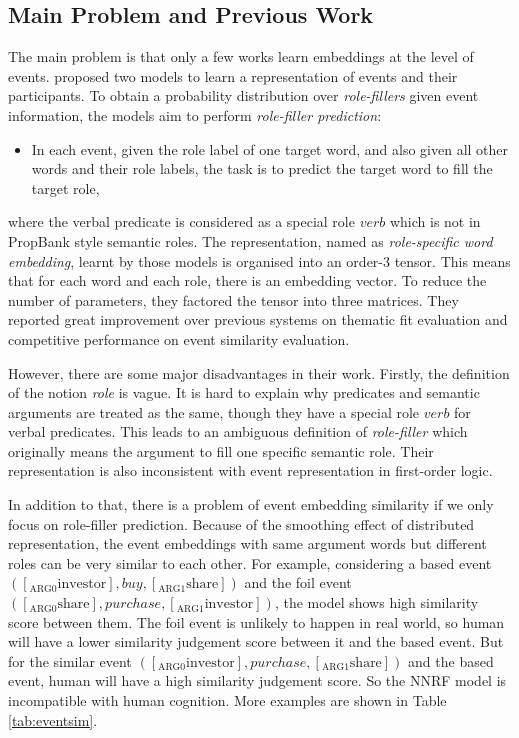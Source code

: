\documentclass[a4paper]{article}
\begin{document}
\subsection{Main Problem and Previous Work}
The main problem is that only a few works learn embeddings at the level of events. \citet{tilk2016event} proposed two models to learn a representation of events and their participants. To obtain a probability distribution over \textit{role-fillers} given event information, the models aim to perform \textit{role-filler prediction}: 
\begin{itemize}
    \item  In each event, given the role label of one target word, and also given all other words and their role labels, the task is to predict the target word to fill the target role,
\end{itemize}
where the verbal predicate is considered as a special role $verb$ which is not in PropBank style semantic roles. The representation, named as \textit{role-specific word embedding}, learnt by those models is organised into an order-3 tensor. This means that for each word and each role, there is an embedding vector. To reduce the number of parameters, they factored the tensor into three matrices. They reported great improvement over previous systems on thematic fit evaluation and competitive performance on event similarity evaluation. 

However, there are some major disadvantages in their work. Firstly, the definition of the notion \textit{role} is vague. It is hard to explain why predicates and semantic arguments are treated as the same, though they have a special role $verb$ for verbal predicates. This leads to an ambiguous definition of \textit{role-filler} which originally means the argument to fill one specific semantic role. Their representation is also inconsistent with event representation in first-order logic. 

In addition to that, there is a problem of event embedding similarity if we only focus on role-filler prediction. Because of the smoothing effect of distributed representation, the event embeddings with same argument words but different roles can be very similar to each other. For example, considering a based event $([_{\text{ARG0}} \text{investor}], buy, [_{\text{ARG1}}\text{share}])$ and the foil event $([_{\text{ARG0}}\text{share}], purchase, [_{\text{ARG1}}\text{investor}])$, the model shows high similarity score between them. The foil event is unlikely to happen in real world, so human will have a lower similarity judgement score between it and the based event. But for the similar event $([_{\text{ARG0}}\text{investor}], purchase, [_{\text{ARG1}}\text{share}])$ and the based event, human will have a high similarity judgement score. So the NNRF model is incompatible with human cognition. More examples are shown in Table \ref{tab:eventsim}. 
\end{document}
